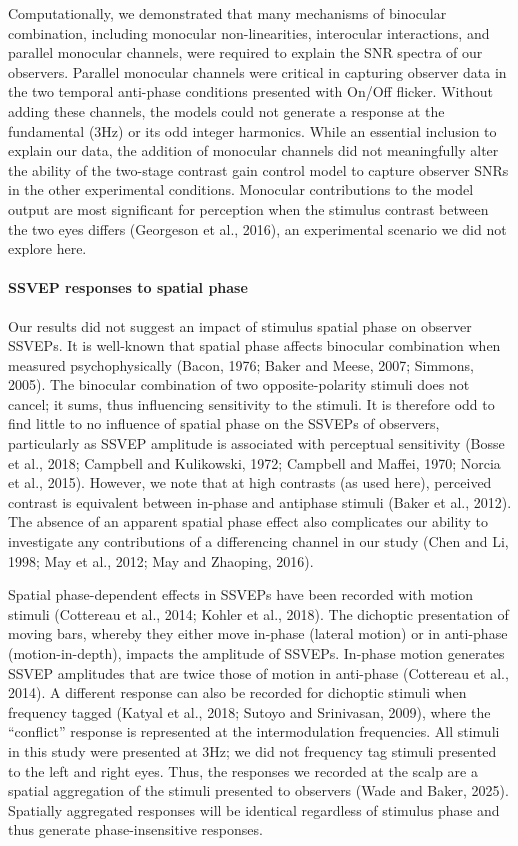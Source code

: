 \documentclass[
  12pt,
]{article}
\let\oldparagraph\paragraph
\renewcommand{\paragraph}[1]{\oldparagraph{#1}\mbox{}}
\begin{document}
Computationally, we demonstrated that many mechanisms of binocular
combination, including monocular non-linearities, interocular
interactions, and parallel monocular channels, were required to explain
the SNR spectra of our observers. Parallel monocular channels were
critical in capturing observer data in the two temporal anti-phase
conditions presented with On/Off flicker. Without adding these channels,
the models could not generate a response at the fundamental (3Hz) or its
odd integer harmonics. While an essential inclusion to explain our data,
the addition of monocular channels did not meaningfully alter the
ability of the two-stage contrast gain control model to capture observer
SNRs in the other experimental conditions. Monocular contributions to
the model output are most significant for perception when the stimulus
contrast between the two eyes differs (Georgeson et al., 2016), an
experimental scenario we did not explore here.

\paragraph{SSVEP responses to spatial
phase}\label{ssvep-responses-to-spatial-phase}

Our results did not suggest an impact of stimulus spatial phase on
observer SSVEPs. It is well-known that spatial phase affects binocular
combination when measured psychophysically (Bacon, 1976; Baker and
Meese, 2007; Simmons, 2005). The binocular combination of two
opposite-polarity stimuli does not cancel; it sums, thus influencing
sensitivity to the stimuli. It is therefore odd to find little to no
influence of spatial phase on the SSVEPs of observers, particularly as
SSVEP amplitude is associated with perceptual sensitivity (Bosse et al.,
2018; Campbell and Kulikowski, 1972; Campbell and Maffei, 1970; Norcia
et al., 2015). However, we note that at high contrasts (as used here),
perceived contrast is equivalent between in-phase and antiphase stimuli
(Baker et al., 2012). The absence of an apparent spatial phase effect
also complicates our ability to investigate any contributions of a
differencing channel in our study (Chen and Li, 1998; May et al., 2012;
May and Zhaoping, 2016).

Spatial phase-dependent effects in SSVEPs have been recorded with motion
stimuli (Cottereau et al., 2014; Kohler et al., 2018). The dichoptic
presentation of moving bars, whereby they either move in-phase (lateral
motion) or in anti-phase (motion-in-depth), impacts the amplitude of
SSVEPs. In-phase motion generates SSVEP amplitudes that are twice those
of motion in anti-phase (Cottereau et al., 2014). A different response
can also be recorded for dichoptic stimuli when frequency tagged (Katyal
et al., 2018; Sutoyo and Srinivasan, 2009), where the ``conflict''
response is represented at the intermodulation frequencies. All stimuli
in this study were presented at 3Hz; we did not frequency tag stimuli
presented to the left and right eyes. Thus, the responses we recorded at
the scalp are a spatial aggregation of the stimuli presented to
observers (Wade and Baker, 2025). Spatially aggregated responses will be
identical regardless of stimulus phase and thus generate
phase-insensitive responses.
\end{document}

